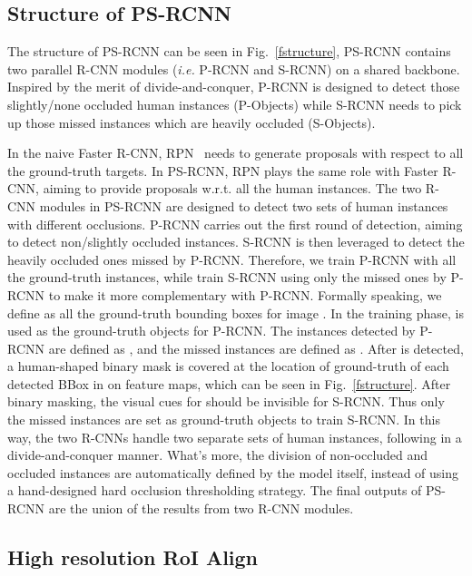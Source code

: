 \documentclass{article}
\begin{document}
\subsection{Structure of PS-RCNN}

The structure of PS-RCNN can be seen in Fig.~\ref{fstructure}, PS-RCNN contains two parallel R-CNN modules (\emph{i.e.} P-RCNN and S-RCNN) on a shared backbone. Inspired by the merit of divide-and-conquer, P-RCNN is designed to detect those slightly/none occluded human instances (P-Objects) while S-RCNN needs to pick up those missed instances which are heavily occluded (S-Objects). 

In the naive Faster R-CNN, RPN~\cite{Ren2017Faster} needs to generate proposals with respect to all the ground-truth targets. In PS-RCNN, RPN plays the same role with Faster R-CNN, aiming to provide proposals w.r.t. all the human instances. The two R-CNN modules in PS-RCNN are designed to detect two sets of human instances with different occlusions. P-RCNN carries out the first round of detection, aiming to detect non/slightly occluded instances. S-RCNN is then leveraged to detect the heavily occluded ones missed by P-RCNN. Therefore, we train P-RCNN with all the ground-truth instances, while train S-RCNN using only the missed ones by P-RCNN to make it more complementary with P-RCNN. Formally speaking, we define  as all the ground-truth bounding boxes for image . In the training phase,  is used as the ground-truth objects for P-RCNN. The instances detected by P-RCNN are defined as , and the missed instances are defined as . After  is detected, a human-shaped binary mask is covered at the location of ground-truth of each detected BBox in  on feature maps, which can be seen in Fig.~\ref{fstructure}. After binary masking, the visual cues for  should be invisible for S-RCNN. Thus only the missed instances  are set as ground-truth objects to train S-RCNN. In this way, the two R-CNNs handle two separate sets of human instances, following in a divide-and-conquer manner. What's more, the division of non-occluded and occluded instances are automatically defined by the model itself, instead of using a hand-designed hard occlusion thresholding strategy. The final outputs of PS-RCNN are the union of the results from two R-CNN modules.

\subsection{High resolution RoI Align}
\end{document}
